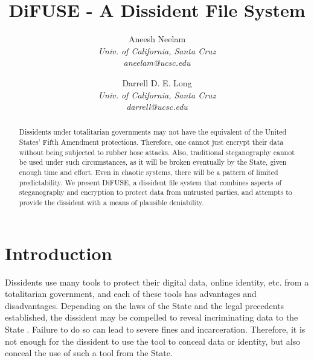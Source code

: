 \documentclass[10pt,twocolumn]{article}
\begin{document}
\title{DiFUSE - A Dissident File System}

\author{
Aneesh Neelam \\
\textit{Univ. of California, Santa Cruz} \\
\textit{aneelam@ucsc.edu}
\and
Darrell D. E. Long \\
\textit{Univ. of California, Santa Cruz} \\
\textit{darrell@ucsc.edu}
}

\maketitle

\begin{abstract}

Dissidents under totalitarian governments may not have the equivalent of the United States' Fifth Amendment protections. Therefore, one cannot just encrypt their data without being subjected to rubber hose attacks. Also, traditional steganography cannot be used under such circumstances, as it will be broken eventually by the State, given enough time and effort. Even in chaotic systems, there will be a pattern of limited predictability.  We present DiFUSE, a dissident file system that combines aspects of steganography and encryption to protect data from untrusted parties, and attempts to provide the dissident with a means of plausible deniability. 

\end{abstract}

\section{Introduction}

Dissidents use many tools to protect their digital data, online identity, etc. from a totalitarian government, and each of these tools has advantages and disadvantages. Depending on the laws of the State and the legal precedents established, the dissident may be compelled to reveal incriminating data to the State \cite{gametheory}. Failure to do so can lead to severe fines and incarceration.  Therefore, it is not enough for the dissident to use the tool to conceal data or identity, but also conceal the use of such a tool from the State. 
\end{document}
